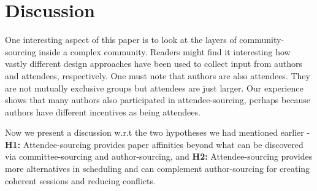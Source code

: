 \documentclass[letterpaper]{article}
\begin{document}
\section{Discussion}
One interesting aspect of this paper is to look at the layers of community-sourcing inside a complex community. Readers might find it interesting how vastly different design approaches have been used to collect input from authors and attendees, respectively. One must note that authors are also attendees. They are not mutually exclusive groups but attendees are just larger. Our experience shows that many authors also participated in attendee-sourcing, perhaps because authors have different incentives as being attendees.

Now we present a discussion w.r.t the two hypotheses we had mentioned earlier - \textbf{H1:} Attendee-sourcing provides paper affinities beyond what can be discovered via committee-sourcing and author-sourcing, and \textbf{H2:} Attendee-sourcing provides more alternatives in scheduling and can complement author-sourcing for creating coherent sessions and reducing conflicts.
\end{document}
